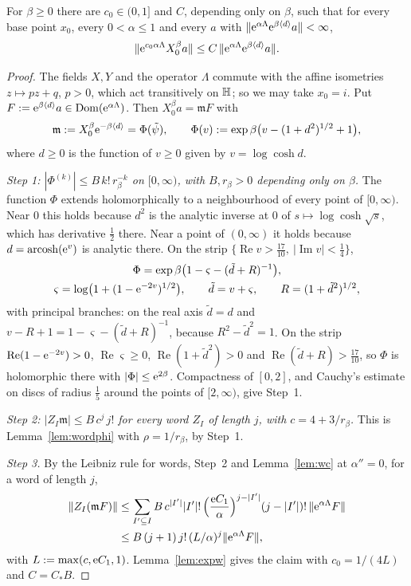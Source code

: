\begin{lemma}\label{lem:m2w}
For $\beta\ge0$ there are $c_0\in(0,1]$ and $C$, depending only on $\beta$, such that for every base point $x_0$, every
$0<\alpha\le1$ and every $a$ with $\lVert \mathrm{e}^{\alpha\Lambda}\mathrm{e}^{\beta\langle d\rangle}a\rVert<\infty$,
\[
\lVert \mathrm{e}^{c_0\alpha\Lambda}X_0^\beta a\rVert\le C\,\lVert \mathrm{e}^{\alpha\Lambda}\mathrm{e}^{\beta\langle d\rangle}a\rVert.
\]
\end{lemma}
\begin{proof}
The fields $X,Y$ and the operator $\Lambda$ commute with the affine isometries $z\mapsto pz+q$, $p>0$, which act transitively on
$\mathbb{H}$; so we may take $x_0=i$. Put $F:=\mathrm{e}^{\beta\langle d\rangle}a\in\operatorname{Dom}(\mathrm{e}^{\alpha\Lambda})$. Then $X_0^\beta a=\mathfrak mF$ with
\[
\mathfrak m:=X_0^\beta\mathrm{e}^{-\beta\langle d\rangle}=\Phi(\tilde\psi),\qquad\Phi(v):=\exp\beta\bigl(v-(1+d^2)^{1/2}+1\bigr),
\]
where $d\ge0$ is the function of $v\ge0$ given by $v=\log\cosh d$.

\emph{Step 1: $|\Phi^{(k)}|\le B\,k!\,r_\beta^{-k}$ on $[0,\infty)$, with $B,r_\beta>0$ depending only on $\beta$.} The function $\Phi$
extends holomorphically to a neighbourhood of every point of $[0,\infty)$. Near $0$ this holds because $d^2$ is the analytic inverse at
$0$ of $s\mapsto\log\cosh\sqrt s$, which has derivative $\tfrac12$ there. Near a point of $(0,\infty)$ it holds because
$d=\operatorname{arcosh}(\mathrm{e}^v)$ is analytic there. On the strip $\{\operatorname{Re}v>\tfrac{17}{10},\ |\operatorname{Im}v|<\tfrac14\}$,
\begin{gather*}
\Phi=\exp\beta\bigl(1-\varsigma-(\tilde d+R)^{-1}\bigr),\\
\varsigma=\log\bigl(1+(1-\mathrm{e}^{-2v})^{1/2}\bigr),\qquad \tilde d=v+\varsigma,\qquad R=(1+\tilde d^2)^{1/2},
\end{gather*}
with principal branches: on the real axis $\tilde d=d$ and $v-R+1=1-\varsigma-(\tilde d+R)^{-1}$, because $R^2-\tilde d^2=1$. On the strip
$\operatorname{Re}(1-\mathrm{e}^{-2v})>0$, $\operatorname{Re}\varsigma\ge0$, $\operatorname{Re}(1+\tilde d^2)>0$ and $\operatorname{Re}(\tilde d+R)>\tfrac{17}{10}$, so $\Phi$
is holomorphic there with $|\Phi|\le\mathrm{e}^{2\beta}$. Compactness of $[0,2]$, and Cauchy's estimate on discs of radius $\tfrac15$ around
the points of $[2,\infty)$, give Step~1.

\emph{Step 2: $|Z_I\mathfrak m|\le B\,c^j\,j!$ for every word $Z_I$ of length $j$, with $c=4+3/r_\beta$.} This is
Lemma~\ref{lem:wordphi} with $\rho=1/r_\beta$, by Step~1.

\emph{Step 3.} By the Leibniz rule for words, Step~2 and Lemma~\ref{lem:wc} at $\alpha''=0$, for a word of length $j$,
\[
\begin{aligned}
\lVert Z_I(\mathfrak mF)\rVert&\le\sum_{I'\subseteq I}B\,c^{|I'|}|I'|!\,\Bigl(\frac{\mathrm{e} C_1}{\alpha}\Bigr)^{j-|I'|}(j-|I'|)!\,\lVert \mathrm{e}^{\alpha\Lambda}F\rVert
\\ &\le B\,(j+1)\,j!\,(L/\alpha)^j\lVert \mathrm{e}^{\alpha\Lambda}F\rVert,
\end{aligned}
\]
with $L:=\max(c,\mathrm{e} C_1,1)$. Lemma~\ref{lem:expw} gives the claim with $c_0=1/(4L)$ and $C=C_*B$.
\end{proof}

